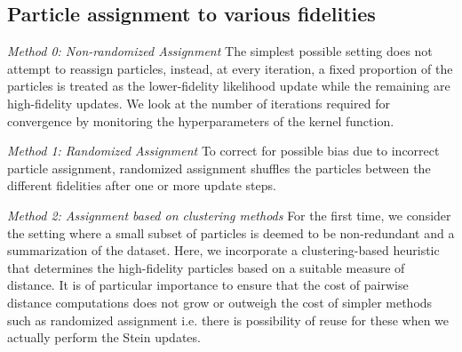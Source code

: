 \documentclass[12pt]{article}
\renewcommand{\[}{\left[}
\renewcommand{\]}{\right]}
\renewcommand{\(}{\left(}
\renewcommand{\)}{\right)}
\begin{document}



\subsection{Particle assignment to various fidelities}

\emph{Method 0: Non-randomized Assignment}
The simplest possible setting does not attempt to reassign particles, instead, at every iteration, a fixed proportion of the particles is treated as the lower-fidelity likelihood update while the remaining are high-fidelity updates. 
We look at the number of iterations required for convergence by monitoring the hyperparameters of the kernel function.

\noindent \emph{Method 1: Randomized Assignment}
To correct for possible bias due to incorrect particle assignment, randomized assignment shuffles the particles between the different fidelities after one or more update steps.

\noindent \emph{Method 2: Assignment based on clustering methods}
For the first time, we consider the setting where a small subset of particles is deemed to be non-redundant and a summarization of the dataset. Here, we incorporate a clustering-based heuristic that determines the high-fidelity particles based on a suitable measure of distance.
It is of particular importance to ensure that the cost of pairwise distance computations does not grow or outweigh the cost of simpler methods such as randomized assignment i.e. there is possibility of reuse for these when we actually perform the Stein updates.
\end{document}
